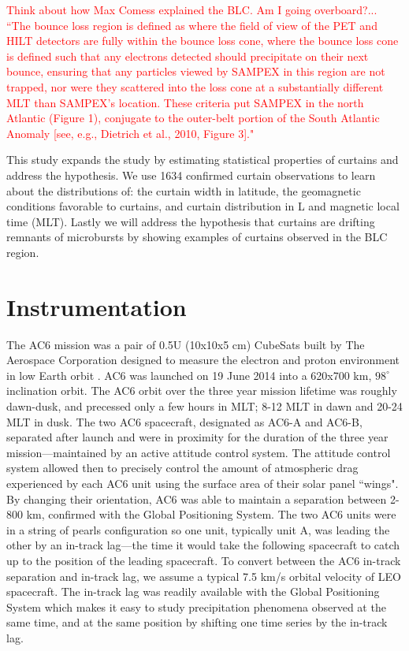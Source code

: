\documentclass[draft]{agujournal2019}
\begin{document}
\textcolor{red}{Think about how Max Comess explained the BLC. Am I going overboard?... ``The bounce loss region is defined as
where the field of view of the PET and HILT detectors are
fully within the bounce loss cone, where the bounce loss cone
is defined such that any electrons detected should precipitate
on their next bounce, ensuring that any particles viewed by
SAMPEX in this region are not trapped, nor were they
scattered into the loss cone at a substantially different MLT
than SAMPEX’s location. These criteria put SAMPEX in
the north Atlantic (Figure 1), conjugate to the outer-belt
portion of the South Atlantic Anomaly [see, e.g., Dietrich
et al., 2010, Figure 3]."}

This study expands the  study by estimating statistical properties of curtains and address the  hypothesis. We use 1634 confirmed curtain observations to learn about the distributions of: the curtain width in latitude, the geomagnetic conditions favorable to curtains, and curtain distribution in L and magnetic local time (MLT). Lastly we will address the hypothesis that curtains are drifting remnants of microbursts by showing examples of curtains observed in the BLC region.

\section{Instrumentation} \label{instrumentation}
The AC6 mission was a pair of 0.5U (10x10x5 cm) CubeSats built by The Aerospace Corporation designed to measure the electron and proton environment in low Earth orbit \cite{O'brien2016}. AC6 was launched on 19 June 2014 into a 620x700 km, $98^\circ$ inclination orbit. The AC6 orbit over the three year mission lifetime was roughly dawn-dusk, and precessed only a few hours in MLT; 8-12 MLT in dawn and 20-24 MLT in dusk. The two AC6 spacecraft, designated as AC6-A and AC6-B, separated after launch and were in proximity for the duration of the three year mission---maintained by an active attitude control system. The attitude control system allowed then to precisely control the amount of atmospheric drag experienced by each AC6 unit using the surface area of their solar panel ``wings". By changing their orientation, AC6 was able to maintain a separation between 2-800 km, confirmed with the Global Positioning System. The two AC6 units were in a string of pearls configuration so one unit, typically unit A, was leading the other by an in-track lag---the time it would take the following spacecraft to catch up to the position of the leading spacecraft. To convert between the AC6 in-track separation and in-track lag, we assume a typical 7.5 km/s orbital velocity of LEO spacecraft. The in-track lag was readily available with the Global Positioning System which makes it easy to study precipitation phenomena observed at the same time, and at the same position by shifting one time series by the in-track lag.
\end{document}
